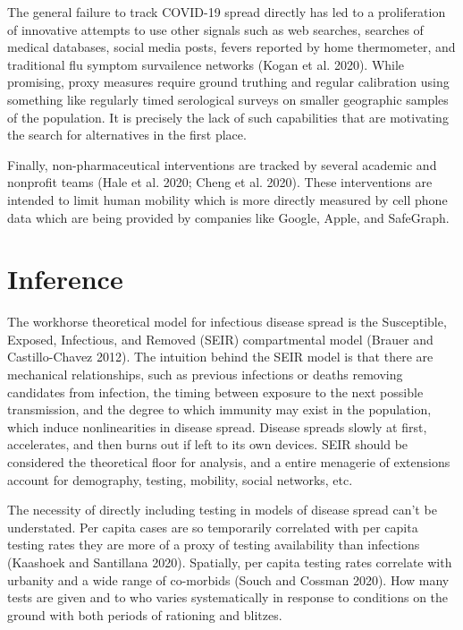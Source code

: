 \documentclass[10pt,letterpaper]{article}
\begin{document}
The general failure to track COVID-19 spread directly has led to a
proliferation of innovative attempts to use other signals such as web
searches, searches of medical databases, social media posts, fevers
reported by home thermometer, and traditional flu symptom survailence
networks (Kogan et al. 2020). While promising, proxy measures require
ground truthing and regular calibration using something like regularly
timed serological surveys on smaller geographic samples of the
population. It is precisely the lack of such capabilities that are
motivating the search for alternatives in the first place.

Finally, non-pharmaceutical interventions are tracked by several
academic and nonprofit teams (Hale et al. 2020; Cheng et al. 2020).
These interventions are intended to limit human mobility which is more
directly measured by cell phone data which are being provided by
companies like Google, Apple, and SafeGraph.

\section{Inference}\label{inference}

The workhorse theoretical model for infectious disease spread is the
Susceptible, Exposed, Infectious, and Removed (SEIR) compartmental model
(Brauer and Castillo-Chavez 2012). The intuition behind the SEIR model
is that there are mechanical relationships, such as previous infections
or deaths removing candidates from infection, the timing between
exposure to the next possible transmission, and the degree to which
immunity may exist in the population, which induce nonlinearities in
disease spread. Disease spreads slowly at first, accelerates, and then
burns out if left to its own devices. SEIR should be considered the
theoretical floor for analysis, and a entire menagerie of extensions
account for demography, testing, mobility, social networks, etc.

The necessity of directly including testing in models of disease spread
can't be understated. Per capita cases are so temporarily correlated
with per capita testing rates they are more of a proxy of testing
availability than infections (Kaashoek and Santillana 2020). Spatially,
per capita testing rates correlate with urbanity and a wide range of
co-morbids (Souch and Cossman 2020). How many tests are given and to who
varies systematically in response to conditions on the ground with both
periods of rationing and blitzes.
\end{document}
